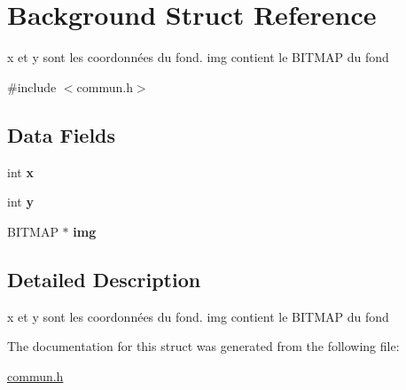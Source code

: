 \hypertarget{struct_background}{\section{Background Struct Reference}
\label{struct_background}
}


x et y sont les coordonnées du fond. img contient le B\-I\-T\-M\-A\-P du fond  




{\ttfamily \#include $<$commun.\-h$>$}

\subsection*{Data Fields}
\begin{DoxyCompactItemize}
\item 
\hypertarget{struct_background_a6150e0515f7202e2fb518f7206ed97dc}{int {\bfseries x}}\label{struct_background_a6150e0515f7202e2fb518f7206ed97dc}

\item 
\hypertarget{struct_background_a0a2f84ed7838f07779ae24c5a9086d33}{int {\bfseries y}}\label{struct_background_a0a2f84ed7838f07779ae24c5a9086d33}

\item 
\hypertarget{struct_background_a8eae42c4d58d3ee6b9aa56d0071971fa}{B\-I\-T\-M\-A\-P $\ast$ {\bfseries img}}\label{struct_background_a8eae42c4d58d3ee6b9aa56d0071971fa}

\end{DoxyCompactItemize}


\subsection{Detailed Description}
x et y sont les coordonnées du fond. img contient le B\-I\-T\-M\-A\-P du fond 


\begin{DoxyItemize}
\item 
\end{DoxyItemize}

The documentation for this struct was generated from the following file\-:\begin{DoxyCompactItemize}
\item 
\hyperlink{commun_8h}{commun.\-h}\end{DoxyCompactItemize}
